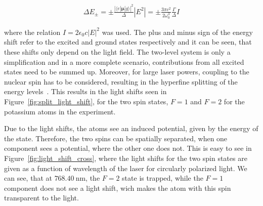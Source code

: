 \begin{align}
	\Delta E_\pm = \pm \frac{|\langle e | \bm{\mu} | g \rangle|^2}{\Delta} |E^2| = \pm \frac{3 \pi c^2}{2 \omega_0^3} \frac{\Gamma}{\Delta} I
\end{align}

where the relation $I=2 \epsilon_0 c |E|^2$ was used. The plus and minus sign of the energy shift refer to the excited and ground states respectively and it can be seen, that these shifts only depend on the light field. The two-level system is only a simplification and in a more complete scenario, contributions from all excited states need to be summed up. Moreover, for large laser powers, coupling to the nuclear spin has to be considered, resulting in the hyperfine splitting of the energy levels~\cite{Grimm2000}. This results in the light shifts seen in Figure~\ref{fig:split_light_shift}, for the two spin states, $F=1$ and $F=2$ for the potassium atoms in the experiment.

\begin{figure}[tbp]%
\end{figure}%


Due to the light shifts, the atoms see an induced potential, given by the energy of the state. Therefore, the two spins can be spatially separated, when one component sees a potential, where the other one does not. This is easy to see in Figure~\ref{fig:light_shift_cross}, where the light shifts for the two spin states are given as a function of wavelength of the laser for circularly polarized light. We can see, that at $\SI{768.40}{\nano\meter}$, the $F=2$ state is trapped, while the $F=1$ component does not see a light shift, wich makes the atom with this spin transparent to the light.

